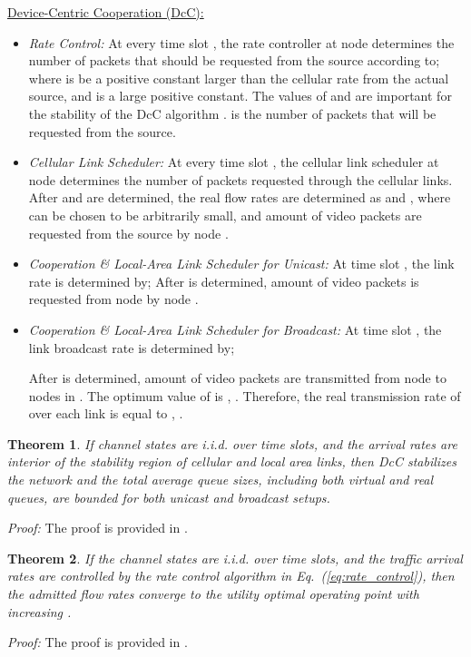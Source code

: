 \documentclass[conference]{IEEEtran}
\newtheorem{theorem}{Theorem}
\begin{document}
\underline{Device-Centric Cooperation (DcC):}
\begin{itemize}
 \item {\em Rate Control:} At every time slot , the rate controller at node  determines the number of packets that should be requested from the source according to;
 where  is be a positive constant larger than the cellular rate from the actual source, and  is a large positive constant. The values of  and  are important for the stability of the DcC algorithm \cite{thisTechRep}.
 is the number of packets that will be requested from the source.


 \item {\em Cellular Link Scheduler:} At every time slot , the cellular link scheduler at node   determines the number of packets requested through the cellular links.
 After  and  are determined, the real flow rates are determined as  and , where  can be chosen to be arbitrarily small, and  amount of video packets are requested from the source by node .

 \item {\em Cooperation \& Local-Area Link Scheduler for Unicast:} At time slot , the link rate  is determined by;
 After  is determined,  amount of video packets is requested from node  by node .

 \item {\em Cooperation \& Local-Area Link Scheduler for Broadcast:}
At time slot , the link broadcast rate is determined by;

After  is determined,  amount of video packets are transmitted from node  to nodes in . The optimum value of  is , . Therefore, the real transmission rate of over each link is equal to
, .

\end{itemize}

\begin{theorem}\label{eec_theorem1}
If channel states are i.i.d. over time slots, and the arrival rates  are interior of the stability region of cellular and local area links, then DcC stabilizes the network and the total average queue sizes, including both virtual and real queues, are bounded for both unicast and broadcast setups.
\end{theorem}
{\em Proof:} The proof is provided in \cite{thisTechRep}.


\begin{theorem}\label{eec_theorem2}
If the channel states are i.i.d. over time slots, and the traffic arrival rates are controlled by the rate control algorithm in Eq.~(\ref{eq:rate_control}), then the admitted flow rates converge to the utility optimal operating point with increasing .
\end{theorem}
{\em Proof:} The proof is provided in \cite{thisTechRep}.
\end{document}
